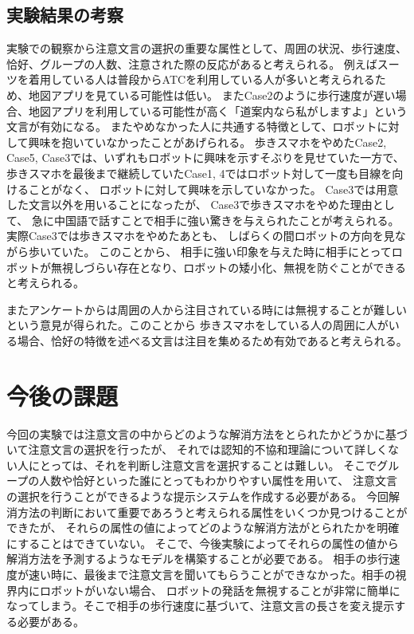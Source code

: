\documentclass{kuisthesis}
\begin{document}
\subsection{実験結果の考察}
実験での観察から注意文言の選択の重要な属性として、周囲の状況、歩行速度、恰好、グループの人数、注意された際の反応があると考えられる。
例えばスーツを着用している人は普段からATCを利用している人が多いと考えられるため、地図アプリを見ている可能性は低い。
またCase2のように歩行速度が遅い場合、地図アプリを利用している可能性が高く「道案内なら私がしますよ」という文言が有効になる。
またやめなかった人に共通する特徴として、ロボットに対して興味を抱いていなかったことがあげられる。
歩きスマホをやめたCase2, Case5, Case3では、いずれもロボットに興味を示すそぶりを見せていた一方で、
歩きスマホを最後まで継続していたCase1, 4ではロボット対して一度も目線を向けることがなく、
ロボットに対して興味を示していなかった。
Case3では用意した文言以外を用いることになったが、
Case3で歩きスマホをやめた理由として、
急に中国語で話すことで相手に強い驚きを与えられたことが考えられる。
実際Case3では歩きスマホをやめたあとも、
しばらくの間ロボットの方向を見ながら歩いていた。
このことから、
相手に強い印象を与えた時に相手にとってロボットが無視しづらい存在となり、ロボットの矮小化、無視を防ぐことができる
と考えられる。

またアンケートからは周囲の人から注目されている時には無視することが難しいという意見が得られた。このことから
歩きスマホをしている人の周囲に人がいる場合、恰好の特徴を述べる文言は注目を集めるため有効であると考えられる。


\section{今後の課題}
今回の実験では注意文言の中からどのような解消方法をとられたかどうかに基づいて注意文言の選択を行ったが、
それでは認知的不協和理論について詳しくない人にとっては、それを判断し注意文言を選択することは難しい。
そこでグループの人数や恰好といった誰にとってもわかりやすい属性を用いて、
注意文言の選択を行うことができるような提示システムを作成する必要がある。
今回解消方法の判断において重要であろうと考えられる属性をいくつか見つけることができたが、
それらの属性の値によってどのような解消方法がとられたかを明確にすることはできていない。
そこで、今後実験によってそれらの属性の値から解消方法を予測するようなモデルを構築することが必要である。
相手の歩行速度が速い時に、最後まで注意文言を聞いてもらうことができなかった。相手の視界内にロボットがいない場合、
ロボットの発話を無視することが非常に簡単になってしまう。そこで相手の歩行速度に基づいて、注意文言の長さを変え提示する必要がある。
\end{document}
